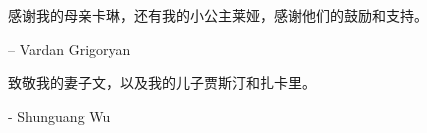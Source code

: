 感谢我的母亲卡琳，还有我的小公主莱娅，感谢他们的鼓励和支持。\par
\begin{flushright}
– Vardan Grigoryan
\end{flushright}

致敬我的妻子文，以及我的儿子贾斯汀和扎卡里。\par
\begin{flushright}
- Shunguang Wu
\end{flushright}
